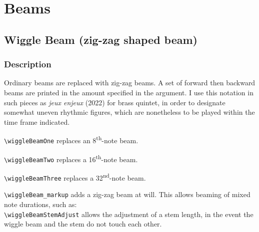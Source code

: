 


\chapter {Beams}

\section {Wiggle Beam (zig-zag shaped beam)}
\hfill
{}
\hfill

\subsection{Description}
Ordinary beams are replaced with zig-zag beams. A set of forward then backward beams are printed in the amount specified in the argument. I use this notation in such pieces as \textit{jeux enjeux} (2022) for brass quintet, in order to designate somewhat uneven rhythmic figures, which are nonetheless to be played within the time frame indicated. 

\verb|\wiggleBeamOne| replaces an 8\textsuperscript{th}-note beam.

\verb|\wiggleBeamTwo| replaces a 16\textsuperscript{th}-note beam.

\verb|\wiggleBeamThree| replaces a 32\textsuperscript{nd}-note beam.

\verb|\wiggleBeam_markup| adds a zig-zag beam at will. This allows beaming of mixed note durations, such as: \\
\verb|\wiggleBeamStemAdjust| allows the adjustment of a stem length, in the event the wiggle beam and the stem do not touch each other. 

